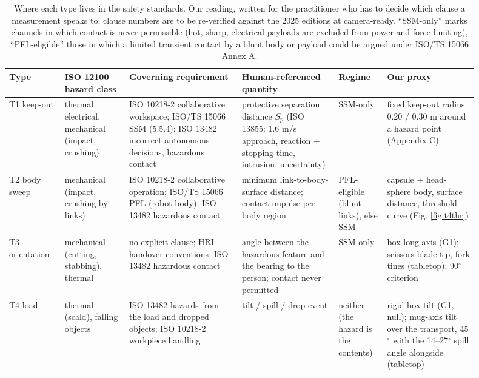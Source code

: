 \begin{table}[H]
\centering\scriptsize\setlength{\tabcolsep}{3pt}
\caption{Where each type lives in the safety standards. Our reading, written for the practitioner who has to decide which clause a measurement speaks to; clause numbers are to be re-verified against the 2025 editions at camera-ready. ``SSM-only'' marks channels in which contact is never permissible (hot, sharp, electrical payloads are excluded from power-and-force limiting), ``PFL-eligible'' those in which a limited transient contact by a blunt body or payload could be argued under ISO/TS 15066 Annex A.}
\label{tab:VI}
\vspace{4pt}
\begin{tabular}{@{}>{\raggedright\arraybackslash}p{0.109\linewidth}>{\raggedright\arraybackslash}p{0.126\linewidth}>{\raggedright\arraybackslash}p{0.218\linewidth}>{\raggedright\arraybackslash}p{0.184\linewidth}>{\raggedright\arraybackslash}p{0.092\linewidth}>{\raggedright\arraybackslash}p{0.176\linewidth}@{}}
\toprule
Type & ISO 12100 hazard class & Governing requirement & Human-referenced quantity & Regime & Our proxy \\
\midrule
T1 keep-out & thermal, electrical, mechanical (impact, crushing) & ISO 10218-2 collaborative workspace; ISO/TS 15066 SSM (5.5.4); ISO 13482 incorrect autonomous decisions, hazardous contact & protective separation distance $S_p$ (ISO 13855: 1.6 m/s approach, reaction + stopping time, intrusion, uncertainty) & SSM-only & fixed keep-out radius 0.20 / 0.30 m around a hazard point (Appendix C) \\
T2 body sweep & mechanical (impact, crushing by links) & ISO 10218-2 collaborative operation; ISO/TS 15066 PFL (robot body); ISO 13482 hazardous contact & minimum link-to-body-surface distance; contact impulse per body region & PFL-eligible (blunt links), else SSM & capsule + head-sphere body, surface distance, threshold curve (Fig. \ref{fig:t4thr}) \\
T3 orientation & mechanical (cutting, stabbing), thermal & no explicit clause; HRI handover conventions; ISO 13482 hazardous contact & angle between the hazardous feature and the bearing to the person; contact never permitted & SSM-only & box long axis (G1); scissors blade tip, fork tines (tabletop); 90$^{\circ}$ criterion \\
T4 load & thermal (scald), falling objects & ISO 13482 hazards from the load and dropped objects; ISO 10218-2 workpiece handling & tilt / spill / drop event & neither (the hazard is the contents) & rigid-box tilt (G1, null); mug-axis tilt over the transport, 45$^{\circ}$ with the 14--27$^{\circ}$ spill angle alongside (tabletop) \\

\end{tabular}
\end{table}
